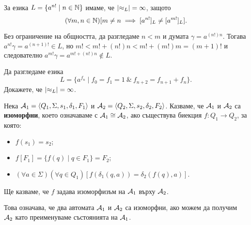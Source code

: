 \begin{example}
  За езика $L = \{a^{n!} \mid n \in \mathbb{N}\}$ имаме, че $\lvert{\approx_L}\rvert = \infty$,
  защото \[(\forall m,n\in\mathbb{N})[m \neq n \implies [a^{n!}]_L \neq [a^{m!}]_L].\]
  
  Без ограничение на общността, да разгледаме $n < m$ и думата $\gamma = a^{(n!)n}$.
  Тогава $a^{n!}\gamma = a^{(n+1)!} \in L$, но 
  $m! < m! + (n!)n < m! + (m!)m = (m+1)!$ и следователно $a^{m!}\gamma = a^{m!+(n!)n}\not\in L$.
\end{example}

\begin{problem}
  Да разгледаме езика
  \[L = \{a^{f_n} \mid f_0 = f_1 = 1\ \&\ f_{n+2} = f_{n+1} + f_{n}\}.\]
  Докажете, че $\lvert{\approx_L}\rvert = \infty$.
\end{problem}


\begin{dfn}
  Нека $\mathcal{A}_1 = \langle{Q_1,\Sigma,s_1,\delta_1,F_1}\rangle$ и $\mathcal{A}_2 = \langle{Q_2,\Sigma,s_2,\delta_2,F_2}\rangle$.
  Казваме, че $\mathcal{A}_1$ и $\mathcal{A}_2$ са {\bf изоморфни}, което означаваме с $\mathcal{A}_1 \cong \mathcal{A}_2$, ако
  съществува биекция $f: Q_1\to Q_2$, за която:
  \begin{itemize}
  \item
    $f(s_1) = s_2$;
  \item
    $f[F_1] = \{f(q)\mid q\in F_1\} = F_2$;
  \item
    $(\forall a\in\Sigma)(\forall q\in Q_1)[f(\delta_1(q,a)) = \delta_2(f(q),a)]$.
  \end{itemize}
  Ще казваме, че $f$ задава изоморфизъм на $\mathcal{A}_1$ върху $\mathcal{A}_2$.
\end{dfn}

Това означава, че два автомата $\mathcal{A}_1$ и $\mathcal{A}_2$ са изоморфни, ако можем да получим $\mathcal{A}_2$
като преименуваме състоянията на $\mathcal{A}_1$.

